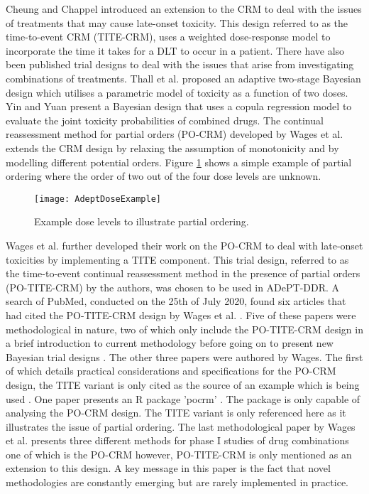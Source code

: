 Cheung and Chappel \cite{cheungSequentialDesignsPhase2000} introduced an extension to the CRM to deal with the issues of treatments that may cause late-onset toxicity. This design referred to as the time-to-event CRM (TITE-CRM), uses a weighted dose-response model to incorporate the time it takes for a DLT to occur in a patient. There have also been published trial designs to deal with the issues that arise from investigating combinations of treatments. Thall et al. \cite{thallDoseFindingTwoAgents2003} proposed an adaptive two-stage Bayesian design which utilises a parametric model of toxicity as a function of two doses. Yin and Yuan \cite{yinBayesianDoseFinding2009} present a Bayesian design that uses a copula regression model to evaluate the joint toxicity probabilities of combined drugs. The continual reassessment method for partial orders (PO-CRM) developed by Wages et al. \cite{wagesContinualReassessmentMethod2011} extends the CRM design by relaxing the assumption of monotonicity and by modelling different potential orders. Figure \ref{fig_adept:example_dose_levels} shows a simple example of partial ordering where the order of two out of the four dose levels are unknown. 

\begin{figure}[h!]
	\centering
	\caption{Example dose levels to illustrate partial ordering.}
	\label{fig_adept:example_dose_levels}
	\texttt{[image: AdeptDoseExample]}
\end{figure}

Wages et al. \cite{wagesContinualReassessmentMethod2011, wagesUsingTimetoeventContinual2013} further developed their work on the PO-CRM to deal with late-onset toxicities by implementing a TITE component. This trial design, referred to as the time-to-event continual reassessment method in the presence of partial orders (PO-TITE-CRM) by the authors, was chosen to be used in ADePT-DDR. A search of PubMed, conducted on the 25th of July 2020, found six articles that had cited the PO-TITE-CRM design by Wages et al. \cite{wagesUsingTimetoeventContinual2013}. Five of these papers were methodological in nature, two of which only include the PO-TITE-CRM design in a brief introduction to current methodology before going on to present new Bayesian trial designs \cite{liuBAYESIANDATAAUGMENTATION2013, wheelerBayesianModelfreeApproach2019}. The other three papers were authored by Wages. The first of which details practical considerations and specifications for the PO-CRM design, the TITE variant is only cited as the source of an example which is being used \cite{wagesSpecificationsContinualReassessment2013}. One paper presents an R package 'pocrm' \cite{wagesPocrmRpackagePhase2013, wagesPocrmDoseFinding2019}. The package is only capable of analysing the PO-CRM design. The TITE variant is only referenced here as it illustrates the issue of partial ordering. The last methodological paper by Wages et al. \cite{wagesPracticalDesignsPhase2016} presents three different methods for phase \RN{1} studies of drug combinations one of which is the PO-CRM however, PO-TITE-CRM is only mentioned as an extension to this design. A key message in this paper is the fact that novel methodologies are constantly emerging but are rarely implemented in practice. 

